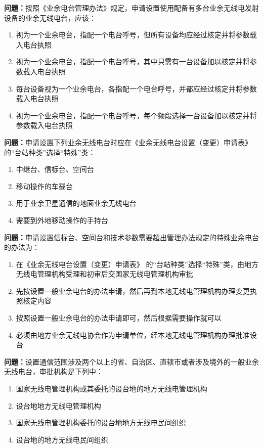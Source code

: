 \bigskip


\noindent\textbf{问题：}按照《业余电台管理办法》规定，申请设置使用配备有多台业余无线电发射设备的业余无线电台，应该：
\begin{enumerate}[label=\Alph*), leftmargin=3em]
\item 视为一个业余电台，指配一个电台呼号，但所有设备均应经过核定并将参数载入电台执照
\item 视为一个业余电台，指配一个电台呼号，其中只需有一台设备加以核定并将参数载入电台执照
\item 每台设备视为一个业余电台，各指配一个电台呼号，并都应经过核定并将参数载入电台执照
\item 视为一个业余电台，指配一个电台呼号，每个频段选择一台设备加以核定并将参数载入电台执照
\end{enumerate}

\bigskip


\noindent\textbf{问题：}申请设置下列业余无线电台时应在《业余无线电台设置（变更）申请表》 的“台站种类”选择“特殊”类：
\begin{enumerate}[label=\Alph*), leftmargin=3em]
\item 中继台、信标台、空间台
\item 移动操作的车载台
\item 用于业余卫星通信的地面业余无线电台
\item 需要到外地移动操作的手持台
\end{enumerate}

\bigskip


\noindent\textbf{问题：}申请设置信标台、空间台和技术参数需要超出管理办法规定的特殊业余电台的办法为：
\begin{enumerate}[label=\Alph*), leftmargin=3em]
\item 在《业余无线电台设置（变更）申请表》 的“台站种类”选择“特殊”类，由地方无线电管理机构受理和初审后交国家无线电管理机构审批
\item 先按设置一般业余电台的办法申请，然后再到本地无线电管理机构办理变更执照核定内容
\item 按照设置一般业余电台的办法申请即可，然后根据需要操作就可以
\item 必须由地方业余无线电协会作为申请单位，经本地无线电管理机构办理批准设台
\end{enumerate}

\bigskip


\noindent\textbf{问题：}设置通信范围涉及两个以上的省、自治区、直辖市或者涉及境外的一般业余无线电台，审批机构是下列中：
\begin{enumerate}[label=\Alph*), leftmargin=3em]
\item 国家无线电管理机构或其委托的设台地的地方无线电管理机构
\item 设台地地方无线电管理机构
\item 国家无线电管理机构委托的设台地地方无线电民间组织
\item 设台地的地方无线电民间组织
\end{enumerate}

